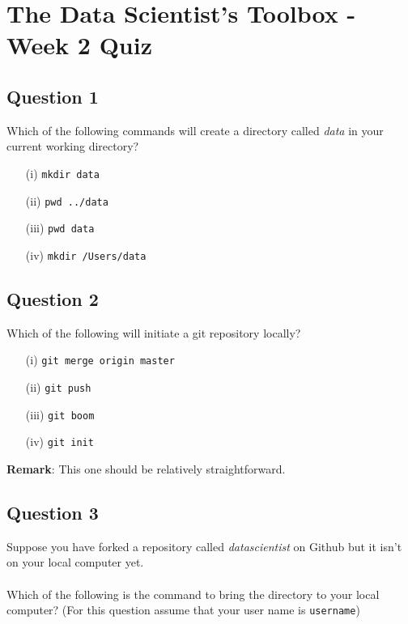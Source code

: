 \documentclass[]{article}
\begin{document}
	
\section*{The Data Scientist’s Toolbox - Week 2 Quiz}

\subsection*{Question 1}
Which of the following commands will create a directory called \textit{data} in your current working directory?
\begin{itemize}
\item[(i)] \texttt{mkdir data}
\item[(ii)] \texttt{pwd ../data}
\item[(iii)] \texttt{pwd data}
\item[(iv)] \texttt{mkdir /Users/data}
\end{itemize}
\subsection*{Question 2}
Which of the following will initiate a git repository locally?

\begin{itemize}
\item[(i)]  \texttt{git merge origin master}
\item[(ii)]  \texttt{git push}
\item[(iii)]  \texttt{git boom}
\item[(iv)]  \texttt{git init} 
\end{itemize}

\textbf{Remark}: This one should be relatively straightforward.
\subsection*{Question 3}
Suppose you have forked a repository called \textit{datascientist} on Github but it isn't on your local computer yet. \\ \\ Which of the following is the command to bring the directory to your local computer? (For this question assume that your user name is \texttt{username})
\end{document}
